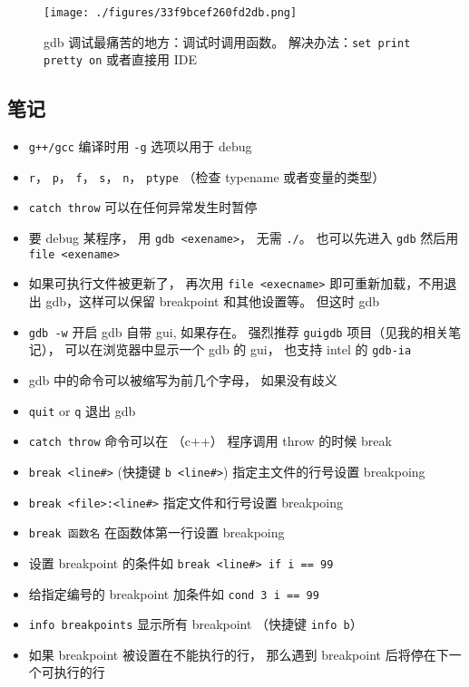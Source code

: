

\begin{figure}[ht]
\centering
\texttt{[image: ./figures/33f9bcef260fd2db.png]}
\caption{gdb 调试最痛苦的地方：调试时调用函数。 解决办法：\verb`set print pretty on` 或者直接用 IDE} \label{fig_gdbNt_1}
\end{figure}

\subsection{笔记}
\begin{itemize}
\item \verb|g++/gcc| 编译时用 \verb`-g` 选项以用于 debug
\item \verb|r|， \verb|p|， \verb|f|， \verb|s|， \verb|n|， \verb|ptype| （检查 typename 或者变量的类型）
\item \verb|catch throw| 可以在任何异常发生时暂停
\item 要 debug 某程序， 用 \verb`gdb <exename>`， 无需 \verb`./`。 也可以先进入 \verb`gdb` 然后用 \verb`file <exename>`
\item 如果可执行文件被更新了， 再次用 \verb`file <execname>` 即可重新加载，不用退出 gdb，这样可以保留 breakpoint 和其他设置等。 但这时 gdb 
\item \verb`gdb -w` 开启 gdb 自带 gui, 如果存在。 强烈推荐 \verb`guigdb` 项目（见我的相关笔记）， 可以在浏览器中显示一个 gdb 的 gui， 也支持 intel 的 \verb`gdb-ia`
\item gdb 中的命令可以被缩写为前几个字母， 如果没有歧义
\item \verb`quit` or \verb`q` 退出 gdb
\item \verb`catch throw` 命令可以在 （c++） 程序调用 throw 的时候 break
\item \verb`break <line#>`  (快捷键 \verb`b <line#>`) 指定主文件的行号设置 breakpoing
\item \verb`break <file>:<line#>` 指定文件和行号设置 breakpoing
\item \verb`break 函数名` 在函数体第一行设置 breakpoing
\item 设置 breakpoint 的条件如 \verb`break <line#> if i == 99`
\item 给指定编号的 breakpoint 加条件如 \verb`cond 3 i == 99`
\item \verb`info breakpoints` 显示所有 breakpoint （快捷键 \verb`info b`）
\item 如果 breakpoint 被设置在不能执行的行， 那么遇到 breakpoint 后将停在下一个可执行的行

\end{itemize}
